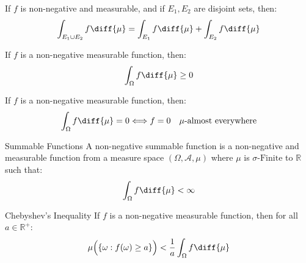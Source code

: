             \begin{theorem}
                If $f$ is non-negative and measurable, and if
                $E_{1},E_{2}$ are disjoint sets, then:
                \begin{equation}
                    \int_{E_{1}\cup{E}_{2}}f\diff{\mu}
                    =\int_{E_{1}}f\diff{\mu}+\int_{E_{2}}f\diff{\mu}
                \end{equation}
            \end{theorem}
            \begin{theorem}
                If $f$ is a non-negative measurable function, then:
                \begin{equation}
                    \int_{\Omega}f\diff{\mu}\geq{0}
                \end{equation}
            \end{theorem}
            \begin{theorem}
                If $f$ is a non-negative measurable function, then:
                \begin{equation}
                    \int_{\Omega}f\diff{\mu}=0
                    \Longleftrightarrow{f=0}
                    \quad\mu\textrm{-almost everywhere}
                \end{equation}
            \end{theorem}
            \begin{ldefinition}{Summable Functions}
                A non-negative summable function is a non-negative
                and measurable function from
                a measure space $(\Omega,\mathcal{A},\mu)$ where
                $\mu$ is $\sigma\textrm{-Finite}$ to $\mathbb{R}$
                such that:
                \begin{equation}
                    \int_{\Omega}f\diff{\mu}<\infty
                \end{equation}
            \end{ldefinition}
            \begin{ltheorem}{Chebyshev's Inequality}
                If $f$ is a non-negative measurable function, then for
                all $a\in\mathbb{R}^{+}$:
                \begin{equation}
                    \mu\Big(\{\omega:f(\omega)\geq{a}\}\Big)
                    <\frac{1}{a}\int_{\Omega}f\diff{\mu}
                \end{equation}
            \end{ltheorem}
